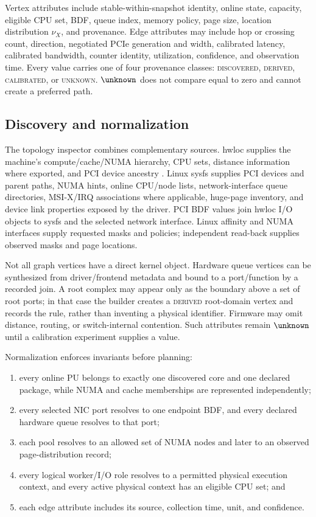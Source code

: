 Vertex attributes include stable-within-snapshot identity, online state, capacity, eligible CPU set, BDF, queue index, memory policy, page size, location distribution $\nu_X$, and provenance. Edge attributes may include hop or crossing count, direction, negotiated PCIe generation and width, calibrated latency, calibrated bandwidth, counter identity, utilization, confidence, and observation time. Every value carries one of four provenance classes: \textsc{discovered}, \textsc{derived}, \textsc{calibrated}, or \textsc{unknown}. $\unknown$ does not compare equal to zero and cannot create a preferred path.

\subsection{Discovery and normalization}

The topology inspector combines complementary sources. hwloc supplies the machine's compute/cache/NUMA hierarchy, CPU sets, distance information where exported, and PCI device ancestry \cite{goglin2014hwloc}. Linux sysfs supplies PCI devices and parent paths, NUMA hints, online CPU/node lists, network-interface queue directories, MSI-X/IRQ associations where applicable, huge-page inventory, and device link properties exposed by the driver. PCI BDF values join hwloc I/O objects to sysfs and the selected network interface. Linux affinity and NUMA interfaces supply requested masks and policies; independent read-back supplies observed masks and page locations.

Not all graph vertices have a direct kernel object. Hardware queue vertices can be synthesized from driver/frontend metadata and bound to a port/function by a recorded join. A root complex may appear only as the boundary above a set of root ports; in that case the builder creates a \textsc{derived} root-domain vertex and records the rule, rather than inventing a physical identifier. Firmware may omit distance, routing, or switch-internal contention. Such attributes remain $\unknown$ until a calibration experiment supplies a value.

Normalization enforces invariants before planning:

\begin{enumerate}[leftmargin=*,itemsep=2pt]
  \item every online PU belongs to exactly one discovered core and one declared package, while NUMA and cache memberships are represented independently;
  \item every selected NIC port resolves to one endpoint BDF, and every declared hardware queue resolves to that port;
  \item each pool resolves to an allowed set of NUMA nodes and later to an observed page-distribution record;
  \item every logical worker/I/O role resolves to a permitted physical execution context, and every active physical context has an eligible CPU set; and
  \item each edge attribute includes its source, collection time, unit, and confidence.
\end{enumerate}

